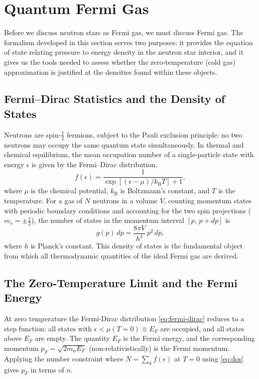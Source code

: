 \section{Quantum Fermi Gas}
\label{sec:fermi}
Before we discuss neutron stars as Fermi gas, we must discuss Fermi gas. The formalism developed in this section serves two purposes: it provides the equation of state relating pressure to energy density in the neutron star interior, and it gives us the tools needed to assess whether the zero-temperature (cold gas) approximation is justified at the densities found within these objects.

\subsection{Fermi--Dirac Statistics and the Density of States}
 
Neutrons are spin-$\tfrac{1}{2}$ fermions, subject to the Pauli
exclusion principle: no two neutrons may occupy the same quantum state
simultaneously. In thermal and chemical equilibrium, the mean occupation
number of a single-particle state with energy $\epsilon$ is given by the
Fermi--Dirac distribution,
%
\begin{equation}
    f(\epsilon) = \frac{1}{\exp\!\left[(\epsilon - \mu)/k_{\mathrm{B}}T\right] + 1},
    \label{eq:fermi-dirac}
\end{equation}
%
where $\mu$ is the chemical potential, $k_{\mathrm{B}}$ is Boltzmann's
constant, and $T$ is the temperature. For a gas of $N$ neutrons in a
volume $V$, counting momentum states with periodic boundary conditions
and accounting for the two spin projections ($m_s = \pm\tfrac{1}{2}$),
the number of states in the momentum interval $[p,\, p + dp]$ is
%
\begin{equation}
    g(p)\,dp = \frac{8\pi V}{h^3}\,p^2\,dp,
    \label{eq:dos}
\end{equation}
%
where $h$ is Planck's constant. This density of states is the
fundamental object from which all thermodynamic quantities of the ideal
Fermi gas are derived.

\subsection{The Zero-Temperature Limit and the Fermi Energy}

 
At zero temperature the Fermi-Dirac distribution \eqref{eq:fermi-dirac}
reduces to a step function: all states with $\epsilon < \mu(T=0) \equiv
E_F$ are occupied, and all states above $E_F$ are empty. The quantity
$E_F$ is the Fermi energy, and the corresponding momentum
$p_F = \sqrt{2m_n E_F}$ (non-relativistically) is the Fermi
momentum. Applying the number constraint where $N = \sum_{k}f(\epsilon)$
at $T = 0$ using \eqref{eq:dos} gives $p_F$ in terms of $n$.

